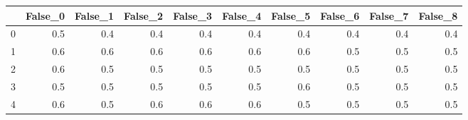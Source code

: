 \begin{tabular}{lrrrrrrrrr}
\toprule
{} &  False\_0 &  False\_1 &  False\_2 &  False\_3 &  False\_4 &  False\_5 &  False\_6 &  False\_7 &  False\_8 \\ \hline
\midrule
0 &      0.5 &      0.4 &      0.4 &      0.4 &      0.4 &      0.4 &      0.4 &      0.4 &      0.4 \\ \hline
1 &      0.6 &      0.6 &      0.6 &      0.6 &      0.6 &      0.6 &      0.5 &      0.5 &      0.5 \\ \hline
2 &      0.6 &      0.5 &      0.5 &      0.5 &      0.5 &      0.5 &      0.5 &      0.5 &      0.5 \\ \hline
3 &      0.5 &      0.5 &      0.5 &      0.5 &      0.5 &      0.6 &      0.5 &      0.5 &      0.5 \\ \hline
4 &      0.6 &      0.5 &      0.6 &      0.6 &      0.6 &      0.5 &      0.5 &      0.5 &      0.5 \\ \hline
\bottomrule
\end{tabular}

